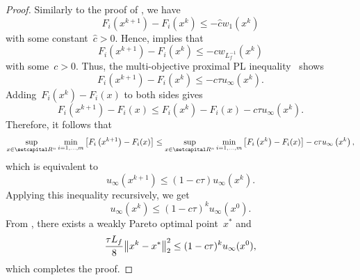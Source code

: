 \documentclass[../../main]{subfiles}
\begin{document}
\begin{proof}
    Similarly to the proof of , we have
    \begin{equation}
        F_i\left(x^{k + 1}\right) - F_i\left(x^k\right) \le - \hat{c} w_1\left(x^k\right)
    \end{equation}
    with some constant~$\hat{c} > 0$.
    Hence,  implies that
    \begin{equation}
        F_i\left(x^{k + 1}\right) - F_i\left(x^k\right) \le - c w_{L_f^{-1}}\left(x^k\right)
    \end{equation}
    with some~$c > 0$.
    Thus, the multi-objective proximal PL inequality~ shows
    \begin{equation}
        F_i\left(x^{k + 1}\right) - F_i\left(x^k\right) \le - c \tau u_\infty\left(x^k\right)
        .\end{equation}
    Adding~$F_i\left(x^k\right) - F_i(x)$ to both sides gives
    \begin{equation}
        F_i\left(x^{k + 1}\right) - F_i(x) \le F_i\left(x^k\right) - F_i(x) - c \tau u_\infty\left(x^k\right)
        .\end{equation}
    Therefore, it follows that
    \begin{equation}
        \sup_{x \in \setR^n} \min_{i = 1, \dots, m} \left[ F_i\left(x^{k + 1}\right) - F_i(x) \right] \le \sup_{x \in \setR^n} \min_{i = 1, \dots, m} \left[ F_i\left(x^k\right) - F_i(x) \right] - c \tau u_\infty\left(x^k\right)
        ,\end{equation}
    which is equivalent to
    \begin{equation}
        u_\infty\left(x^{k + 1}\right) \le ( 1 - c \tau ) u_\infty\left(x^k\right)
        .\end{equation}
    Applying this inequality recursively, we get
    \begin{equation}
        u_\infty\left(x^k\right) \le (1 - c \tau)^k u_\infty(x^0)
        .\end{equation}
    From , there exists a weakly Pareto optimal point~$x^*$ and
    \begin{equation}
        \frac{\tau L_f}{8} \norm*{x^k - x^*}_2^2 \le (1 - c \tau)^k u_\infty(x^0)
        ,\end{equation}
    which completes the proof.
\end{proof}
\end{document}
